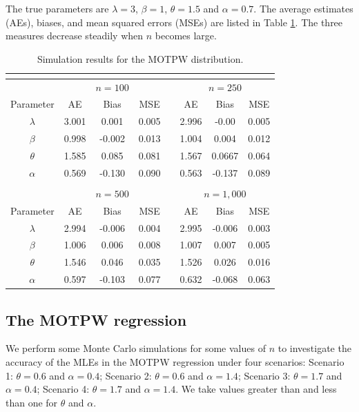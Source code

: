 \documentclass[12pt]{article}
\begin{document}
The true parameters are $\lambda=3$, $\beta = 1$, $\theta = 1.5 $ and $\alpha = 0.7$.
The average estimates (AEs), biases, and mean squared errors (MSEs) are listed in Table \ref{sim_MOTPW}. The three measures decrease steadily when $n$
becomes large.\\
 \begin{table}[htb!]
 	\small \centering \caption{Simulation results for the MOTPW distribution.} \label{sim_MOTPW} {\small
 		\begin{tabular}{cccccccc}
 			\multicolumn{8}{c}{} \\
 			\hline &  & \multicolumn{1}{c}{$n=100$} &       &
 			& \multicolumn{3}{c}{$n=250$}
 			\\ \cline{2-4} \cline{6-8}
 			Parameter & AE &  Bias  & MSE   &    & AE    &  Bias   & MSE\\
 			\hline
 			$\lambda$ &3.001 &0.001  &0.005& &2.996 &-0.00 &0.005\\
 			$\beta$   &0.998 &-0.002 &0.013& &1.004 &0.004 &0.012\\
 			$\theta$  &1.585 &0.085  &0.081& &1.567 &0.0667&0.064\\
 			$\alpha$  &0.569 &-0.130 &0.090& &0.563 &-0.137&0.089\\
 			\multicolumn{8}{c}{} \\
 			\hline &  & \multicolumn{1}{c}{$n=500$} &  && \multicolumn{3}{c}{$n=1,000$}
 			\\ \cline{2-4} \cline{6-8}
 			Parameter & AE &  Bias  & MSE   &    & AE    &  Bias   & MSE\\
 			\hline
 			$\lambda$ &2.994 &-0.006 &0.004& &2.995 &-0.006 &0.003\\
 			$\beta$   &1.006 &0.006  &0.008& &1.007 &0.007  &0.005\\
 			$\theta$  &1.546 &0.046  &0.035& &1.526 &0.026  &0.016\\
 			$\alpha$  &0.597 &-0.103 &0.077& &0.632 &-0.068 &0.063\\
 			\hline
 		\end{tabular}}
 	\end{table}			


\subsection{The MOTPW regression}

We perform some Monte Carlo simulations for some values of $n$ to investigate the accuracy
of the MLEs in the MOTPW regression under four scenarios: Scenario 1: $\theta = 0.6$ and $ \alpha = 0.4$; Scenario 2: $\theta = 0.6$ and $\alpha = 1.4$;
Scenario 3: $\theta = 1.7$ and $\alpha = 0.4$; Scenario 4: $\theta = 1.7$ and $\alpha = 1.4$.
We take values greater than and less than one for $\theta$ and $\alpha$.
\end{document}
